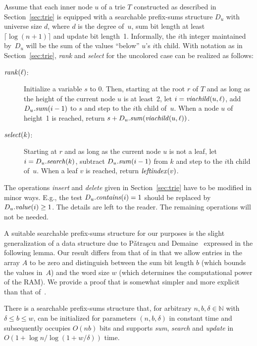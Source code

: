 \documentclass[envcountsame,envcountsect,undated,nolinenumbers]{lnthi}
\def\Tvn#1{\hbox{\textit{#1\/}}}
\def\Tceil#1{\lceil #1\rceil}
\def\TbbbN{\mathbb{N}}
\begin{document}
Assume that each inner node $u$ of a trie $T$ constructed
as described in Section~\ref{sec:trie} is equipped
with a searchable prefix-sums structure $D_u$ with
universe size $d$, where $d$ is the degree of~$u$,
sum bit length at least
$\Tceil{\log(n+1)}$ and update bit length~1.
Informally, the $i$th integer maintained by~$D_u$
will be the sum of the values ``below'' $u$'s
$i$th child.
With notation as in
Section~\ref{sec:trie}, \Tvn{rank} and \Tvn{select}
for the uncolored case
can be realized as follows:

\begin{description}
\item[\normalfont$\Tvn{rank}(\ell)$:]
Initialize a variable $s$ to 0.
Then, starting at the root $r$ of $T$ and as long as the
height of the current node $u$ is at least~2,
let $i=\Tvn{viachild}(u,\ell)$,
add $D_u.\Tvn{sum}(i-1)$ to $s$ and step
to the $i$th child of~$u$.
When a node $u$ of height~1 is reached,
return $s+D_u.\Tvn{sum}(\Tvn{viachild}(u,\ell))$.
\item[\normalfont$\Tvn{select}(k)$:]
Starting at $r$ and as long as the current node
$u$ is not a leaf,
let $i=D_u.\Tvn{search}(k)$,
subtract $D_u.\Tvn{sum}(i-1)$ from $k$
and step to the $i$th child of~$u$.
When a leaf $v$ is reached, return $\Tvn{leftindex}(v)$.
\end{description}

The operations \Tvn{insert} and \Tvn{delete} given
in Section~\ref{sec:trie} have to
be modified in minor ways.
E.g., the test $D_u.\Tvn{contains}(i)=1$
should be replaced by $D_u.\Tvn{value}(i)\ge 1$.
The details are left to the reader.
The remaining operations will not be needed.

A suitable searchable prefix-sums structure for our
purposes is the slight generalization of a data
structure due to
P\v atra\c scu and Demaine~\cite[Section~8]{PatD06}
expressed in the following lemma.
Our result differs from that of
\cite{PatD06} in that we allow
entries in the array $A$ to be zero and
distinguish between the sum bit length $b$
(which bounds the values in~$A$)
and the word size $w$
(which determines the computational power
of the RAM).
We provide a proof that is somewhat
simpler and more explicit than
that of~\cite{PatD06}.

\begin{lemma}
\label{lem:prefSum}There is a searchable prefix-sums structure that,
for arbitrary $n,b,\delta\in\TbbbN$ with
$\delta\le b\le w$, can be initialized
for parameters $(n,b,\delta)$
in constant time and subsequently
occupies $O(n b)$ bits and supports
\Tvn{sum}, \Tvn{search} and \Tvn{update}
in $O(1+{{\log n}/{\log(1+{w/\delta})}})$ time.
\end{lemma}
\end{document}
